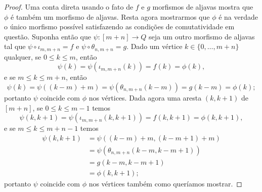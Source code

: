 \begin{proof}
    Uma conta direta usando o fato de $f$ e $g$ morfismos de aljavas mostra que $\phi$ é também um morfismo de aljavas.
    Resta agora mostrarmos que $\phi$ é na verdade o único morfismo possível satisfazendo as condições de comutatividade em questão.
    Suponha então que $\psi: [m+n] \to Q$ seja um outro morfismo de aljavas tal que $\psi \circ \iota_{m,m+n} = f$ e $\psi \circ \theta_{n,m+n} = g$.
    Dado um vértice $k \in \{0,\dots,m+n\}$ qualquer, se $0 \leq k \leq m$, então
    \begin{displaymath}
        \psi(k) = \psi(\iota_{m,m+n}(k)) = f(k) = \phi(k),
    \end{displaymath}
    e se $m \leq k \leq m+n$, então
    \begin{displaymath}
        \psi(k) = \psi((k-m)+m) = \psi(\theta_{n,m+n}(k-m)) = g(k-m) = \phi(k);
    \end{displaymath}
    portanto $\psi$ coincide com $\phi$ nos vértices.
    Dada agora uma aresta $(k,k+1)$ de $[m+n]$, se $0 \leq k \leq m-1$ temos
    \begin{displaymath}
        \psi(k,k+1) = \psi(\iota_{m,m+n}(k,k+1)) = f(k,k+1) = \phi(k,k+1),
    \end{displaymath}
    e se $m \leq k \leq m+n-1$ temos
    \begin{align*}
        \psi(k,k+1)
        & = \psi((k-m)+m,(k-m+1)+m) \\
        & = \psi(\theta_{n,m+n}(k-m,k-m+1)) \\
        & = g(k-m,k-m+1) \\
        & = \phi(k,k+1);
    \end{align*}
    portanto $\psi$ coincide com $\phi$ nos vértices também como queríamos mostrar.
\end{proof}
